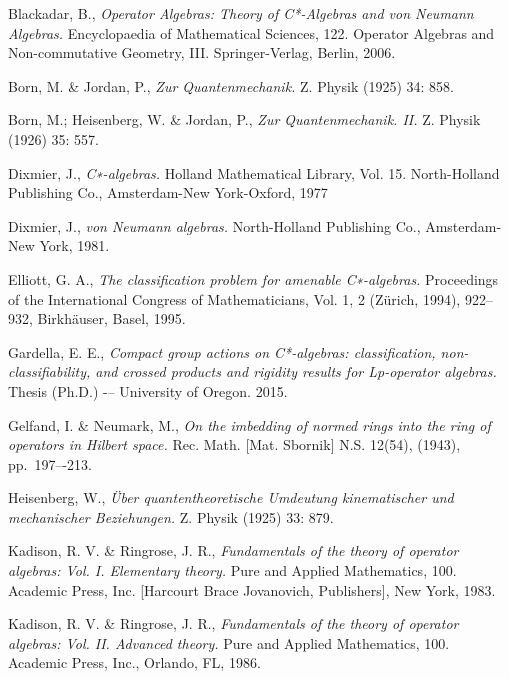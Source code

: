 \documentclass[12pt,a4paper]{amsart}
\theoremstyle{plain}
\theoremstyle{definition}
\begin{document}
\clearpage 

\begin{thebibliography}{00}
	Blackadar, B.,
	\emph{Operator Algebras: Theory of C*-Algebras and von Neumann Algebras.}
	Encyclopaedia of Mathematical Sciences, 122. Operator Algebras and Non-commutative Geometry, III. Springer-Verlag, Berlin, 2006.
	
	Born, M. \& Jordan, P.,
	\emph{Zur Quantenmechanik.}
	Z. Physik (1925) 34: 858.
	
	Born, M.; Heisenberg, W. \& Jordan, P.,
	\emph{Zur Quantenmechanik. II.}
	Z. Physik (1926) 35: 557.

	Dixmier, J.,
	\emph{C∗-algebras.}
	Holland Mathematical Library, Vol. 15. North-Holland Publishing Co., Amsterdam-New York-Oxford, 1977

	Dixmier, J.,
	\emph{von Neumann algebras.}
	North-Holland Publishing Co., Amsterdam-New York, 1981.
		
	Elliott, G. A.,
	\emph{The classification problem for amenable C∗-algebras.}
	Proceedings of the International Congress of Mathematicians, Vol. 1, 2 (Zürich, 1994), 922–932, Birkhäuser, Basel, 1995.

	Gardella, E. E.,
	\emph{Compact group actions on C*-algebras: classification, non-classifiability, and crossed products and rigidity results for Lp-operator algebras. }
	Thesis (Ph.D.) -– University of Oregon. 2015.


	Gelfand, I. \& Neumark, M.,
	\emph{On the imbedding of normed rings into the ring of operators in Hilbert space.}
	Rec. Math. [Mat. Sbornik] N.S. 12(54), (1943), pp.~197–-213.

	Heisenberg, W.,
	\emph{{\"U}ber quantentheoretische Umdeutung kinematischer und mechanischer Beziehungen.}
	Z. Physik (1925) 33: 879. 
	
	Kadison, R. V. \& Ringrose, J. R.,
	\emph{Fundamentals of the theory of operator algebras: Vol. I. Elementary theory.}
	Pure and Applied Mathematics, 100. Academic Press, Inc. [Harcourt Brace Jovanovich, Publishers], New York, 1983.

	Kadison, R. V. \& Ringrose, J. R.,
	\emph{Fundamentals of the theory of operator algebras: Vol. II. Advanced theory.}
	Pure and Applied Mathematics, 100. Academic Press, Inc., Orlando, FL, 1986.
	

\end{thebibliography}
\end{document}
